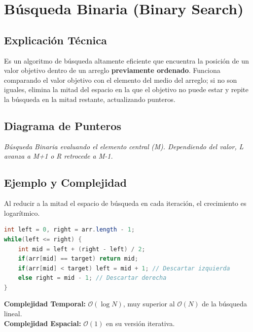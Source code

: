 \documentclass[12pt]{article}
\begin{document}
\newpage
\section{Búsqueda Binaria (Binary Search)}
\subsection{Explicación Técnica}
Es un algoritmo de búsqueda altamente eficiente que encuentra la posición de un valor objetivo dentro de un arreglo \textbf{previamente ordenado}. Funciona comparando el valor objetivo con el elemento del medio del arreglo; si no son iguales, elimina la mitad del espacio en la que el objetivo no puede estar y repite la búsqueda en la mitad restante, actualizando punteros.

\subsection{Diagrama de Punteros}
\begin{center}
\end{center}
\textit{Búsqueda Binaria evaluando el elemento central (M). Dependiendo del valor, L avanza a M+1 o R retrocede a M-1.}

\subsection{Ejemplo y Complejidad}
Al reducir a la mitad el espacio de búsqueda en cada iteración, el crecimiento es logarítmico.
\begin{lstlisting}[language=Java]
int left = 0, right = arr.length - 1;
while(left <= right) {
    int mid = left + (right - left) / 2;
    if(arr[mid] == target) return mid;
    if(arr[mid] < target) left = mid + 1; // Descartar izquierda
    else right = mid - 1; // Descartar derecha
}
\end{lstlisting}
\textbf{Complejidad Temporal:} $\mathcal{O}(\log N)$, muy superior al $\mathcal{O}(N)$ de la búsqueda lineal. \\
\textbf{Complejidad Espacial:} $\mathcal{O}(1)$ en su versión iterativa.
\end{document}
